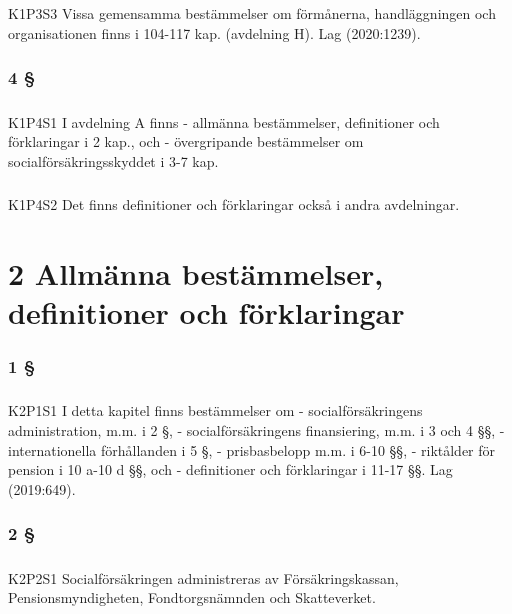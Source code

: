 \documentclass[a4paper,notitlepage,openany,10pt]{book}
\begin{document}
\paragraph*{}
{\tiny K1P3S3}
Vissa gemensamma bestämmelser om förmånerna, handläggningen och organisationen finns i 104-117 kap. (avdelning H).
Lag (2020:1239).
\subsection*{4 §}
\paragraph*{}
{\tiny K1P4S1}
I avdelning A finns
\newline - allmänna bestämmelser, definitioner och förklaringar i 2 kap., och
\newline - övergripande bestämmelser om socialförsäkringsskyddet i 3-7 kap.
\paragraph*{}
{\tiny K1P4S2}
Det finns definitioner och förklaringar också i andra avdelningar.
\chapter*{2 Allmänna bestämmelser, definitioner och förklaringar}
\subsection*{1 §}
\paragraph*{}
{\tiny K2P1S1}
I detta kapitel finns bestämmelser om
\newline - socialförsäkringens administration, m.m. i 2 §,
\newline - socialförsäkringens finansiering, m.m. i 3 och 4 §§,
\newline - internationella förhållanden i 5 §,
\newline - prisbasbelopp m.m. i 6-10 §§,
\newline - riktålder för pension i 10 a-10 d §§, och
\newline - definitioner och förklaringar i 11-17 §§.
Lag (2019:649).
\subsection*{2 §}
\paragraph*{}
{\tiny K2P2S1}
Socialförsäkringen administreras av Försäkringskassan, Pensionsmyndigheten, Fondtorgsnämnden och Skatteverket.
\end{document}
